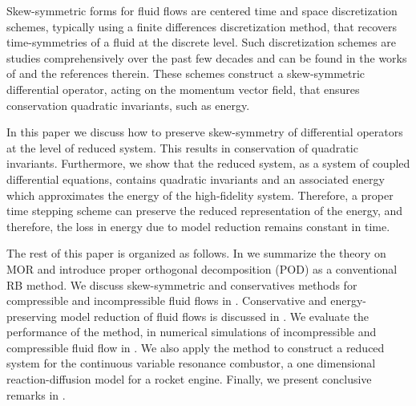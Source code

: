 Skew-symmetric forms for fluid flows are centered time and space discretization schemes, typically using a finite differences discretization method, that recovers time-symmetries of a fluid at the discrete level. Such discretization schemes are studies comprehensively over the past few decades and can be found in the works of \cite{morinishi2010skew,morinishi1998fully,desjardins2008high,reiss2014conservative,reiss2014conservative} and the references therein. These schemes construct a skew-symmetric differential operator, acting on the momentum vector field, that ensures conservation quadratic invariants, such as energy.  

In this paper we discuss how to preserve skew-symmetry of differential operators at the level of reduced system. This results in conservation of quadratic invariants. Furthermore, we show that the reduced system, as a system of coupled differential equations, contains quadratic invariants and an associated energy which approximates the energy of the high-fidelity system. Therefore, a proper time stepping scheme can preserve the reduced representation of the energy, and therefore, the loss in energy due to model reduction remains constant in time.

The rest of this paper is organized as follows. In  we summarize the theory on MOR and introduce proper orthogonal decomposition (POD) as a conventional RB method. We discuss skew-symmetric and conservatives methods for compressible and incompressible fluid flows in . Conservative and energy-preserving model reduction of fluid flows is discussed in . We evaluate the performance of the method, in numerical simulations of incompressible and compressible fluid flow in . We also apply the method to construct a reduced system for the continuous variable resonance combustor, a one dimensional reaction-diffusion model for a rocket engine. Finally, we present conclusive remarks in .
